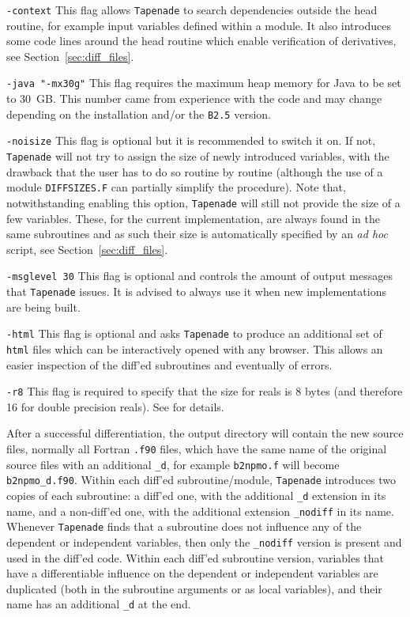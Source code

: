 \begin{description}
  \item {\tt -context} This flag allows {\tt Tapenade} to search dependencies outside the head routine, for example input variables defined within a module. It also introduces some code lines around the head routine which enable verification of derivatives, see Section~\ref{sec:diff_files}.

  \item {\tt -java "-mx30g"} This flag requires the maximum heap memory for Java to be set to 30~GB. This number came from experience with the code and may change depending on the installation and/or the {\tt B2.5} version.

  \item {\tt -noisize} This flag is optional but it is recommended to switch it on. If not, {\tt Tapenade} will not try to assign the size of newly introduced variables, with the drawback that the user has to do so routine by routine (although the use of a module {\tt DIFFSIZES.F} can partially simplify the procedure). Note that, notwithstanding enabling this option, {\tt Tapenade} will still not provide the size of a few variables. These, for the current implementation, are always found in the same subroutines and as such their size is automatically specified by an {\it ad hoc} script, see Section~\ref{sec:diff_files}.

  \item {\tt -msglevel 30} This flag is optional and controls the amount of output messages that {\tt Tapenade} issues. It is advised to always use it when new implementations are being built.

  \item {\tt -html} This flag is optional and asks {\tt Tapenade} to produce an additional set of {\tt html} files which can be interactively opened with any browser. This allows an easier inspection of the diff'ed subroutines and eventually of errors.

  \item {\tt -r8} This flag is required to specify that the size for reals is 8 bytes (and therefore 16 for double precision reals). See \cite{tapesite} for details.
\end{description}

After a successful differentiation, the output directory will contain the new source files, normally all Fortran {\tt .f90} files, which have the same name of the original source files with an additional {\tt \_d}, for example {\tt b2npmo.f} will become {\tt b2npmo\_d.f90}. Within each diff'ed subroutine/module, {\tt Tapenade} introduces two copies of each subroutine: a diff'ed one, with the additional {\tt \_d} extension in its name, and a non-diff'ed one, with the additional extension {\tt \_nodiff} in its name. Whenever {\tt Tapenade} finds that a subroutine does not influence any of the dependent or independent variables, then only the {\tt \_nodiff} version is present and used in the diff'ed code. Within each diff'ed subroutine version, variables that have a differentiable influence on the dependent or independent variables are duplicated (both in the subroutine arguments or as local variables), and their name has an additional {\tt \_d} at the end.


